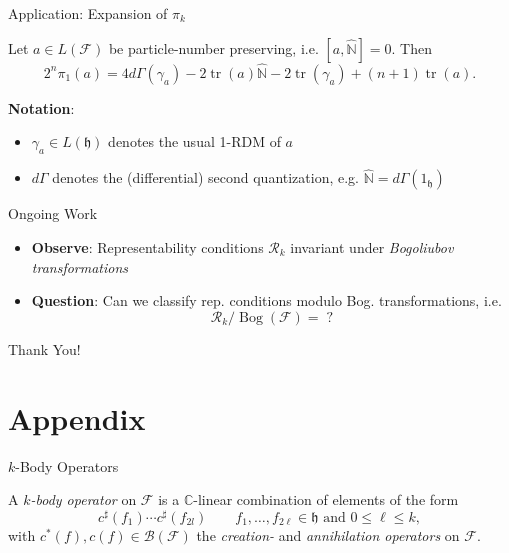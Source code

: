 \documentclass{beamer}
\DeclareMathOperator{\tr}{tr}
\newcommand{\IN}{\ensuremath{\mathbb{N}}}
\newcommand{\IC}{\ensuremath{\mathbb{C}}}
\newcommand{\HilbertSpace}{\ensuremath{\mathfrak{h}}}
\newcommand{\FockSpace}{\mathcal{F}}
\begin{document}
\begin{frame}{Application: Expansion of $\pi_k$}
  \begin{corollary}
    Let $a\in L(\FockSpace)$ be particle-number preserving, i.e. $[a,\hat{\IN}]=0$. Then
    \begin{equation}
      2^n\pi_1(a)=4d\Gamma(\gamma_a)-2\tr(a)\hat{\IN}-2\tr(\gamma_a)+(n+1)\tr(a).
    \end{equation}
  \end{corollary}
  \textbf{Notation}:
  \begin{itemize}
    \item $\gamma_a\in L(\HilbertSpace)$ denotes the usual 1-RDM of $a$
    \item $d\Gamma$ denotes the (differential) second quantization, e.g. $\hat{\IN}=d\Gamma(1_\HilbertSpace)$
  \end{itemize}
\end{frame}

\begin{frame}{Ongoing Work}
  \begin{itemize}
    \item \textbf{Observe}: Representability conditions $\mathcal{R}_k$ invariant under \emph{Bogoliubov transformations}
    \item \textbf{Question}: Can we classify rep. conditions modulo Bog. transformations, i.e.
      \begin{equation*}
        \mathcal{R}_k/\operatorname{Bog}(\FockSpace)=\;?
      \end{equation*}
  \end{itemize}
\end{frame}

\begin{frame}
  \begin{center}
    {\Huge Thank You!}
  \end{center}
\end{frame}

\section{Appendix}
\frame{\sectionpage}

\begin{frame}{$k$-Body Operators}
\begin{definition}
    A \emph{$k$-body operator} on $\FockSpace$ is a $\IC$-linear
    combination of elements of the form
    \begin{equation}
        c^\sharp(f_1)\cdots c^\sharp(f_{2l})\qquad f_1,\ldots,f_{2\ell}\in\HilbertSpace
        \text{ and }0\le \ell\le k,
    \end{equation}
    with $c^*(f),c(f)\in\mathcal{B}(\FockSpace)$ the \emph{creation-} and
    \emph{annihilation operators} on $\FockSpace$.
\end{definition}
\end{frame}
\end{document}
